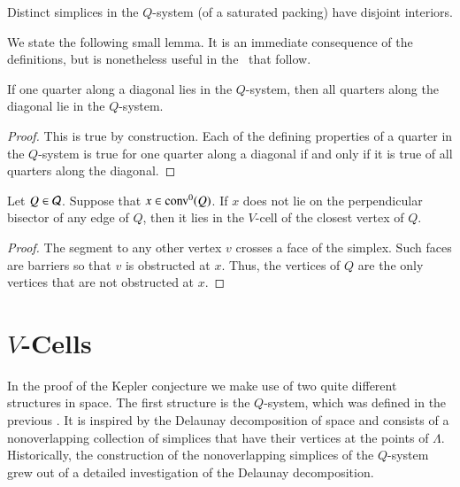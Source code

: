 \begin{claim}\label{thm:nonoverlap}
Distinct simplices in the $Q$-system (of a saturated packing) have
disjoint interiors.
\end{claim}


We state the following small lemma. It is an immediate consequence
of the definitions, but is nonetheless useful in the \chaps\ that
follow.

\begin{lemma} \label{lemma:diags-engulf}
If one quarter along a diagonal lies in the $Q$-system, then all
quarters along the diagonal lie in the $Q$-system.
\end{lemma}

\begin{proof} This is true by construction.  Each of the defining properties
of a quarter in the $Q$-system is true for one quarter along a
diagonal if and only if  it is true of all quarters along the
diagonal.
\end{proof}



\begin{lemma}\label{lemma:Q-divide}
Let $Q\in{\mathcal Q}$. Suppose that $x\in {\operatorname{conv}}^0(Q)$.
If $x$
does not lie on the perpendicular bisector of any edge of $Q$,
then it lies in the $V$-cell of the closest vertex of $Q$.
\end{lemma}

\begin{proof} The segment to any other vertex $v$ crosses a face of the
simplex. Such faces are barriers so that $v$ is obstructed at $x$.
Thus, the vertices of $Q$ are the only vertices that are not
obstructed at $x$.
\end{proof}



\section{$V$-Cells}
\label{sec:cells} \label{sec:vcells}

In the proof of the Kepler conjecture we make use of two quite
different structures in space.  The first structure is the
$Q$-system, which was defined in the previous \chap.  It is
inspired by the Delaunay decomposition of space and consists of a
nonoverlapping collection of simplices that have their vertices at
the points of $\Lambda$.  Historically, the construction of the
nonoverlapping simplices of the $Q$-system grew out of a detailed
investigation of the Delaunay decomposition.

